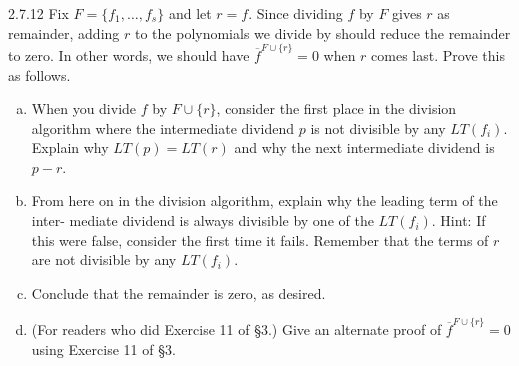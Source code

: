 \documentclass[twoside]{article}
\begin{document}
\newpage

\begin{ejercicio}{2.7.12}
Fix $F = \{ f_1 , \dots , f_s \}$ and let $r = f$. Since dividing $f$ by $F$ gives $r$ as remainder, adding
$r$ to the polynomials we divide by should reduce the remainder to zero. In other words,
we should have $\overline{f}^{F∪\{r\}}
= 0$ when $r$ comes last. Prove this as follows.
\begin{enumerate}[a.]
\item When you divide $f$ by $F ∪\{r\}$, consider the first place in the division algorithm where
the intermediate dividend $p$ is not divisible by any $LT ( f_i )$. Explain why $LT (p) =
LT (r)$ and why the next intermediate dividend is $p − r$.
\item From here on in the division algorithm, explain why the leading term of the inter-
mediate dividend is always divisible by one of the $LT ( f_i )$. Hint: If this were false,
consider the first time it fails. Remember that the terms of $r$ are not divisible by any
$LT ( f_i )$.
\item Conclude that the remainder is zero, as desired.
\item (For readers who did Exercise 11 of §3.) Give an alternate proof of $\overline{f}^{F∪\{r\}}
= 0$ using
Exercise 11 of §3.
\end{enumerate}
\end{ejercicio}
\end{document}
